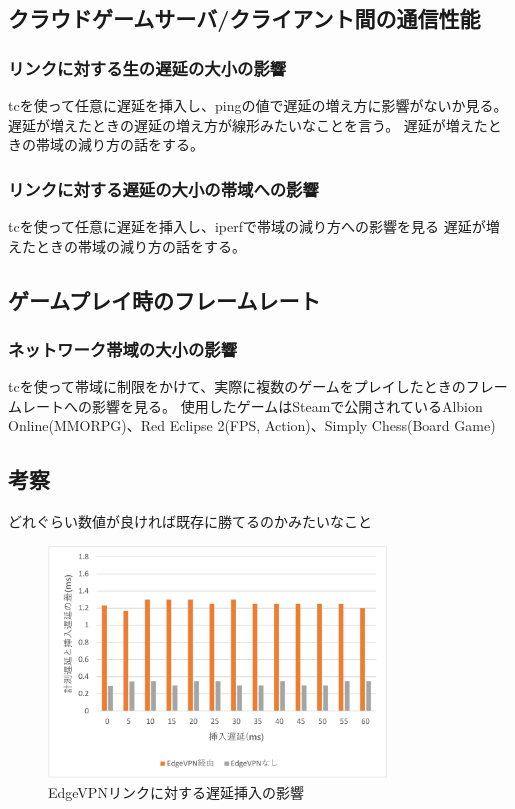 \subsection{クラウドゲームサーバ/クライアント間の通信性能}

\subsubsection{リンクに対する生の遅延の大小の影響}
tcを使って任意に遅延を挿入し、pingの値で遅延の増え方に影響がないか見る。
遅延が増えたときの遅延の増え方が線形みたいなことを言う。
遅延が増えたときの帯域の減り方の話をする。

\subsubsection{リンクに対する遅延の大小の帯域への影響}
tcを使って任意に遅延を挿入し、iperfで帯域の減り方への影響を見る
遅延が増えたときの帯域の減り方の話をする。

\subsection{ゲームプレイ時のフレームレート}

\subsubsection{ネットワーク帯域の大小の影響}
tcを使って帯域に制限をかけて、実際に複数のゲームをプレイしたときのフレームレートへの影響を見る。
使用したゲームはSteamで公開されているAlbion Online(MMORPG)、Red Eclipse 2(FPS, Action)、Simply Chess(Board Game)

\subsection{考察}
どれぐらい数値が良ければ既存に勝てるのかみたいなこと



\begin{figure}[t]
    \centering
    \includegraphics[width=0.8\textwidth,keepaspectratio,clip]{img/graph_ratency.pdf}
    \caption{EdgeVPNリンクに対する遅延挿入の影響}
    \label{fig:ratency}
\end{figure}

